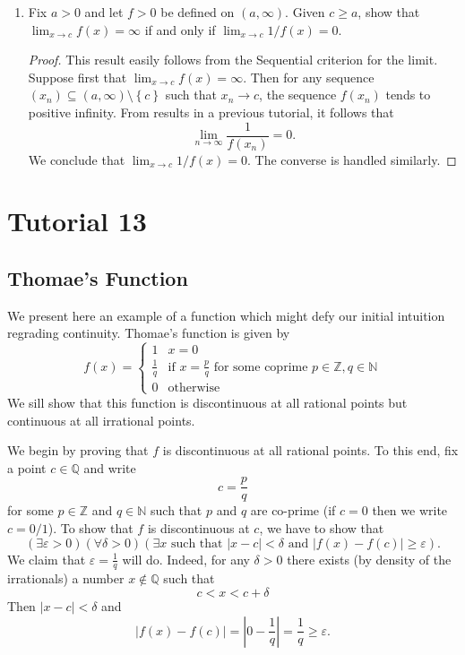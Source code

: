\documentclass[12pt, reqno]{article}
\numberwithin{equation}{section}
\theoremstyle{definition}
\theoremstyle{remark}
\newcommand{\NN}{\mathbb{N}}
\newcommand{\QQ}{\mathbb{Q}}
\newcommand{\ZZ}{\mathbb{Z}}
\newcommand{\set}[1]{\left\{#1\right\}}
\newcommand{\abs}[1]{\left\lvert#1\right\rvert}
\renewcommand{\epsilon}{\varepsilon}
\begin{document}
\begin{enumerate}[leftmargin=*]
	\item Fix $a>0$ and let $f > 0$ be defined on $(a, \infty)$. Given $c \geq a$, show that $\lim_{x\to c}f(x) = \infty$ if and only if $\lim_{x\to c} 1/f(x) = 0$.

	      \begin{proof}
		      This result easily follows from the Sequential criterion for the limit. Suppose first that $\lim_{x\to c}f(x) = \infty$. Then for any sequence $(x_n) \subseteq (a, \infty)\setminus\set{c}$ such that $x_n \to c$, the sequence $f(x_n)$ tends to positive infinity. From results in a previous tutorial, it follows that
		      \[
			      \lim_{n\to\infty}\frac{1}{f(x_n)} = 0.
		      \]
		      We conclude that $\lim_{x\to c} 1/f(x) = 0$. The converse is handled similarly.
	      \end{proof}
\end{enumerate}

\section*{Tutorial 13}

\subsection*{Thomae's Function} We present here an example of a function which might defy our initial intuition regrading continuity. Thomae's function is given by
\[
	f(x) = \begin{cases}
		1           & x=0                                                                     \\
		\frac{1}{q} & \text{if } x= \frac{p}{q} \text{ for some coprime } p \in \ZZ, q\in \NN \\
		0           & \text{otherwise}
	\end{cases}
\]
We sill show that this function is discontinuous at all rational points but continuous at all irrational points.

We begin by proving that $f$ is discontinuous at all rational points. To this end, fix a point $c\in \QQ$ and write
\[
	c = \frac{p}{q}
\]
for some $p\in \ZZ$ and $q\in \NN$ such that $p$ and $q$ are co-prime (if $c=0$ then we write $c=0/1$). To show that $f$ is discontinuous at $c$, we have to show that
\[
	(\exists \epsilon > 0)(\forall \delta > 0)(\exists x\text{ such that } \abs{x-c} < \delta \text{ and } \abs{f(x) - f(c)} \geq \epsilon).
\]
We claim that $\epsilon = \frac{1}{q}$ will do. Indeed, for any $\delta > 0$ there exists (by density of the irrationals) a number $x\not\in\QQ$ such that
\[
	c < x < c+\delta
\]
Then $\abs{x-c} < \delta$ and
\[
	\abs{f(x) - f(c)} = \abs{0 - \frac{1}{q}} = \frac{1}{q} \geq \epsilon.
\]
\end{document}
